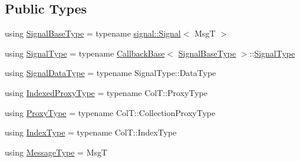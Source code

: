 \subsection*{Public Types}
\begin{DoxyCompactItemize}
\item 
using \hyperlink{structvt_1_1pipe_1_1callback_1_1_callback_proxy_send_a29a3c5e7cc3dc714225103d1a4d8856d}{Signal\+Base\+Type} = typename \hyperlink{structvt_1_1pipe_1_1signal_1_1_signal}{signal\+::\+Signal}$<$ MsgT $>$
\item 
using \hyperlink{structvt_1_1pipe_1_1callback_1_1_callback_proxy_send_a6c3776f3cfa93c54603d0b4245291979}{Signal\+Type} = typename \hyperlink{structvt_1_1pipe_1_1callback_1_1_callback_base}{Callback\+Base}$<$ \hyperlink{structvt_1_1pipe_1_1callback_1_1_callback_proxy_send_a29a3c5e7cc3dc714225103d1a4d8856d}{Signal\+Base\+Type} $>$\+::\hyperlink{structvt_1_1pipe_1_1callback_1_1_callback_proxy_send_a6c3776f3cfa93c54603d0b4245291979}{Signal\+Type}
\item 
using \hyperlink{structvt_1_1pipe_1_1callback_1_1_callback_proxy_send_a2a8b17dedeb5cc2b68ca5c7386796ef3}{Signal\+Data\+Type} = typename Signal\+Type\+::\+Data\+Type
\item 
using \hyperlink{structvt_1_1pipe_1_1callback_1_1_callback_proxy_send_a993aff1afaaf07a0d2c60a4ca96426f8}{Indexed\+Proxy\+Type} = typename Col\+T\+::\+Proxy\+Type
\item 
using \hyperlink{structvt_1_1pipe_1_1callback_1_1_callback_proxy_send_a2aece7c6f8bd17a4c0b1fdca75d84579}{Proxy\+Type} = typename Col\+T\+::\+Collection\+Proxy\+Type
\item 
using \hyperlink{structvt_1_1pipe_1_1callback_1_1_callback_proxy_send_adf233dca6b029304153ba59fecf6113f}{Index\+Type} = typename Col\+T\+::\+Index\+Type
\item 
using \hyperlink{structvt_1_1pipe_1_1callback_1_1_callback_proxy_send_afe339627ac5afeace49518e3236911e0}{Message\+Type} = MsgT
\end{DoxyCompactItemize}
